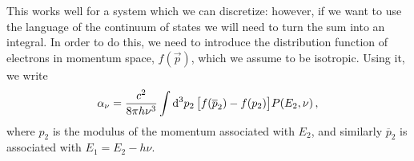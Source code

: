 \documentclass[main.tex]{subfiles}
\begin{document}
This works well for a system which we can discretize: however, if we want to use the language of the continuum of states we will need to turn the sum into an integral.
In order to do this, we need to introduce the distribution function of electrons in momentum space, \(f(\vec{p})\), which we assume to be isotropic. Using it, we write 
%
\begin{align}
\alpha _\nu = 
\frac{c^2}{8 \pi h \nu^3}
\int \dd[3]{p_2 } \qty[ f(\overline{p}_2 )- f(p_2 )]P (E_2 , \nu )
\,,
\end{align}
%
where \(p_2 \) is the modulus of the momentum associated with \(E_2 \), and similarly \(\overline{p}_2\) is associated with \(E_1 = E_2 - h \nu \). 
\end{document}
